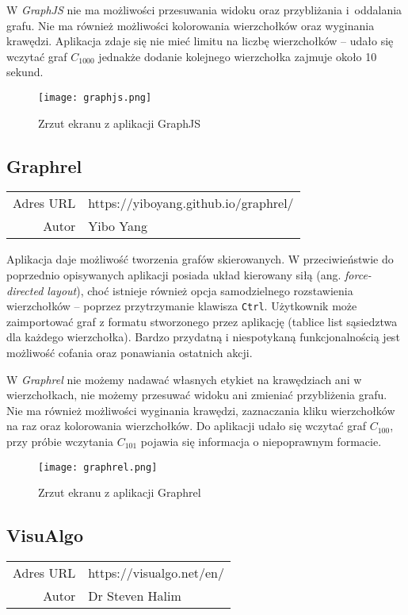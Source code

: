 W \textit{GraphJS} nie ma możliwości przesuwania widoku oraz przybliżania i~oddalania grafu. Nie ma również możliwości kolorowania wierzchołków oraz wyginania krawędzi. Aplikacja zdaje się nie mieć limitu na liczbę wierzchołków -- udało się wczytać graf $C_{1000}$ jednakże dodanie kolejnego wierzchołka zajmuje około 10 sekund.

\begin{figure}[H]
\caption{Zrzut ekranu z aplikacji GraphJS}
\centering
\texttt{[image: graphjs.png]}
\end{figure}


\subsection*{Graphrel}
\bigskip
\noindent\begin{tabularx}{\textwidth}{r|X|}
\cline{2-2}
  Adres URL & https://yiboyang.github.io/graphrel/ \\ 
\cline{2-2} 
 Autor & Yibo Yang \\ 
\cline{2-2}
\end{tabularx} 
\bigskip

Aplikacja daje możliwość tworzenia grafów skierowanych. W przeciwieństwie do poprzednio opisywanych aplikacji posiada układ kierowany siłą (ang. \textit{force-directed layout}), choć istnieje również opcja samodzielnego rozstawienia wierzchołków -- poprzez przytrzymanie klawisza \texttt{Ctrl}. Użytkownik może zaimportować graf z formatu stworzonego przez aplikację (tablice list sąsiedztwa dla każdego wierzchołka). Bardzo przydatną i niespotykaną funkcjonalnością jest możliwość cofania oraz ponawiania ostatnich akcji. 

W \textit{Graphrel} nie możemy nadawać własnych etykiet na krawędziach ani w wierzchołkach, nie możemy przesuwać widoku ani zmieniać przybliżenia grafu. Nie ma również możliwości wyginania krawędzi, zaznaczania kliku wierzchołków na raz oraz kolorowania wierzchołków. Do aplikacji udało się wczytać graf $C_{100}$, przy próbie wczytania $C_{101}$ pojawia się informacja o niepoprawnym formacie.

\begin{figure}[H]
\caption{Zrzut ekranu z aplikacji Graphrel}
\centering
\texttt{[image: graphrel.png]}
\end{figure}


\subsection*{VisuAlgo}
\bigskip
\noindent\begin{tabularx}{\textwidth}{r|X|}
\cline{2-2}
  Adres URL & https://visualgo.net/en/ \\ 
\cline{2-2} 
 Autor & Dr Steven Halim \\ 
\cline{2-2}
\end{tabularx} 
\bigskip


